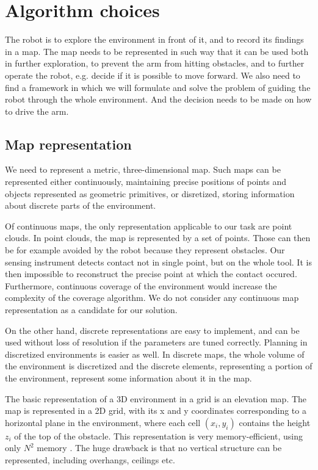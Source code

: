\documentclass[buriama8_dp.tex]{subfiles}
\begin{document}
\chapter{Algorithm choices}

The robot is to explore the environment in front of it, and to record its findings in a map. The map needs to be represented in such way that it can be used both in further exploration, to prevent the arm from hitting obstacles, and to further operate the robot, e.g. decide if it is possible to move forward. We also need to find a framework in which we will formulate and solve the problem of guiding the robot through the whole environment. And the decision needs to be made on how to drive the arm.

\section{Map representation}

We need to represent a metric, three-dimensional map. Such maps can be represented either continuously, maintaining precise positions of points and objects represented as geometric primitives, or disretized, storing information about discrete parts of the environment.

Of continuous maps, the only representation applicable to our task are point clouds. In point clouds, the map is represented by a set of points. Those can then be for example avoided by the robot because they represent obstacles. Our sensing instrument detects contact not in single point, but on the whole tool. It is then impossible to reconstruct the precise point at which the contact occured. Furthermore, continuous coverage of the environment would increase the complexity of the coverage algorithm. We do not consider any continuous map representation as a candidate for our solution.

On the other hand, discrete representations are easy to implement, and can be used without loss of resolution if the parameters are tuned correctly. Planning in discretized environments is easier as well. In discrete maps, the whole volume of the environment is discretized and the discrete elements, representing a portion of the environment, represent some information about it in the map.

The basic representation of a 3D environment in a grid is an elevation map. The map is represented in a 2D grid, with its \m x and \m y coordinates corresponding to a horizontal plane in the environment, where each cell \((x_i, y_i)\) contains the height \(z_i\) of the top of the obstacle. This representation is very memory-efficient, using only \(N^2\) memory . The huge drawback is that no vertical structure can be represented, including overhangs, ceilings etc.
\end{document}
